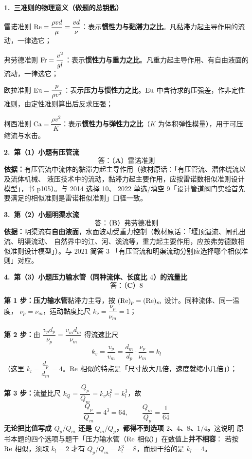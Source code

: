 \begin{jie}
\textbf{1.\ 三准则的物理意义（做题的总钥匙）}
\begin{xiaowen}
\item 雷诺准则 $\mathrm{Re}=\dfrac{\rho v d}{\mu}=\dfrac{v d}{\nu}$：表示\textbf{惯性力与黏滞力之比}。凡黏滞力起主导作用的流动，一律选它；
\item 弗劳德准则 $\mathrm{Fr}=\dfrac{v^{2}}{gl}$：表示\textbf{惯性力与重力之比}。凡重力起主导作用、有自由液面的流动，一律选它；
\item 欧拉准则 $\mathrm{Eu}=\dfrac{p}{\rho v^{2}}$：表示\textbf{压力与惯性力之比}。$\mathrm{Eu}$ 中含待求的压强差，作非定性准则，由定性准则算出后反求压强；
\item 柯西准则 $\mathrm{Ca}=\dfrac{\rho v^{2}}{K}$：表示\textbf{惯性力与弹性力之比}（$K$ 为体积弹性模量），用于可压缩流与水击。
\end{xiaowen}

\textbf{2.\ 第（1）小题\quad 有压管流}
\[ \textbf{答：（A）雷诺准则} \]
\textbf{依据：}有压管流中流体的黏滞力起主导作用（教材原话：「有压管流、潜体绕流以及流体机械、
液压技术中的流动，黏滞力起主要作用，应按雷诺数相似准则设计模型」，书 p105）。与 2014 选择 10、
2022 单选/填空 9「设计管道阀门实验首先要满足的相似准则是雷诺相似准则」口径一致。

\textbf{3.\ 第（2）小题\quad 明渠水流}
\[ \textbf{答：（B）弗劳德准则} \]
\textbf{依据：}明渠流有\textbf{自由液面}，水面波动受重力控制（教材原话：「堰顶溢流、闸孔出流、明渠流动、
自然界中的江、河、溪流等，重力起主要作用，应按弗劳德数相似准则设计模型」）。与 2021 简答 3
「有压管流和明渠流动分别应选择哪个相似准则」对应。

\textbf{4.\ 第（3）小题\quad 压力输水管（同种流体、长度比 $4$）的流量比}
\[ \textbf{答：（C）$8$} \]

\textbf{第 1 步：}\textbf{压力输水管}黏滞力主导，按 $(\mathrm{Re})_p=(\mathrm{Re})_m$ 设计。同种流体、同一温度，
$\nu_p=\nu_m$，运动黏度比尺 $k_\nu=\dfrac{\nu_p}{\nu_m}=1$；

\textbf{第 2 步：}由 $\dfrac{v_p d_p}{\nu_p}=\dfrac{v_m d_m}{\nu_m}$ 得流速比尺
\[ k_v=\frac{v_p}{v_m}=\frac{d_m}{d_p}\cdot\frac{\nu_p}{\nu_m}=k_l \]
（这里 $k_l=\dfrac{d_p}{d_m}=4$。$\mathrm{Re}$ 相似的特点是「尺寸放大几倍，速度就缩小几倍」）；

\textbf{第 3 步：}流量比尺 $k_Q=\dfrac{Q_p}{Q_m}=k_vk_l^{2}=k_l^{3}$，故
\[ \frac{Q_p}{Q_m}=4^{3}=64,\qquad \frac{Q_m}{Q_p}=\frac{1}{64} \]
\textbf{无论把比值写成 $Q_p/Q_m$ 还是 $Q_m/Q_p$，都得不到选项 $2$、$4$、$8$、$1/4$。}这说明
原书本题的四个选项与题干「压力输水管（$\mathrm{Re}$ 相似）」在数值上\textbf{并不相容}：
若按 $\mathrm{Re}$ 相似，须取 $k_l=2$ 才有 $Q_p/Q_m=k_l^{3}=8$，而题干给的是 $k_l=4$。


\end{jie}
